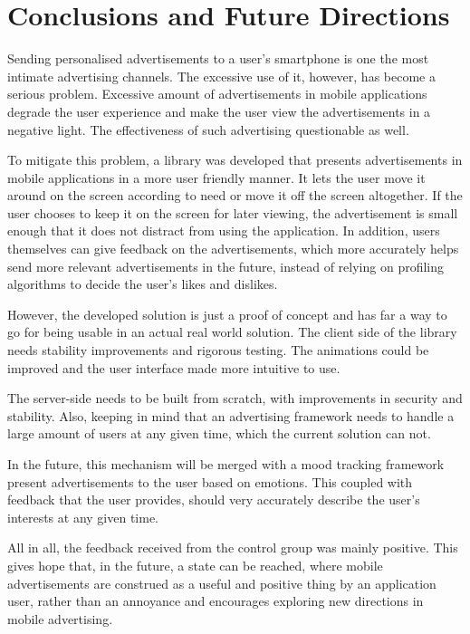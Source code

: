 \chapter{Conclusions and Future Directions}

Sending personalised advertisements to a user's smartphone is one the most intimate advertising channels. The excessive use of it, however, has become a serious problem. Excessive amount of advertisements in mobile applications degrade the user experience and make the user view the advertisements in a negative light. The effectiveness of such advertising questionable as well.

To mitigate this problem, a library was developed that presents advertisements in mobile applications in a more user friendly manner. It lets the user move it around on the screen according to need or move it off the screen altogether. If the user chooses to keep it on the screen for later viewing, the advertisement is small enough that it does not distract from using the application. In addition, users themselves can give feedback on the advertisements, which more accurately helps send more relevant advertisements in the future, instead of relying on profiling algorithms to decide the user's likes and dislikes.

However, the developed solution is just a proof of concept and has far a way to go for being usable in an actual real world solution. The client side of the library needs stability improvements and rigorous testing. The animations could be improved and the user interface made more intuitive to use.

The server-side needs to be built from scratch, with improvements in security and stability. Also, keeping in mind that an advertising framework needs to handle a large amount of users at any given time, which the current solution can not.

In the future, this mechanism will be merged with a mood tracking framework present advertisements to the user based on emotions. This coupled with feedback that the user provides, should very accurately describe the user's interests at any given time.

All in all, the feedback received from the control group was mainly positive. This gives hope that, in the future, a state can be reached, where mobile advertisements are construed as a useful and positive thing by an application user, rather than an annoyance and encourages exploring new directions in mobile advertising.